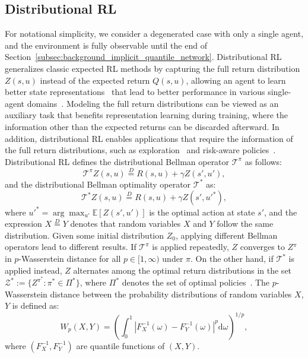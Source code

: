 \documentclass[twoside,11pt]{article}
\newcommand{\state}{s}
\newcommand{\action}{u}
\newcommand{\rewardfunction}{R}
\newcommand{\utilityexp}{Q}
\newcommand{\utility}{Z}
\newcommand{\quantile}{\omega}
\newcommand{\inversecdf}{F^{-1}}
\begin{document}
\subsection{Distributional RL}
\label{subsec:background_distributional_rl}

For notational simplicity, we consider a degenerated case with only a single agent, and the environment is fully observable until the end of Section~\ref{subsec:background_implicit_quantile_network}. Distributional RL generalizes classic expected RL methods by capturing the full return distribution $\utility{}(\state{},\action{})$ instead of the expected return $\utilityexp{}(\state{},\action{})$, allowing an agent to learn better state representations~\citep{BDR2022} that lead to better performance in various single-agent domains~\citep{Bellemare2017C51,Bellemare2019S51,Dabney2018QR-DQN,Dabney2018IQN,Rowland2019ER-DQN,Yang2019FQF,Nguyen2021MMDRL}. Modeling the full return distributions can be viewed as an auxiliary task that benefits representation learning during training, where the information other than the expected returns can be discarded afterward. In addition, distributional RL enables applications that require the information of the full return distributions, such as exploration~\citep{Nikolov2019IDS,Zhang2019QUOTA,Mavrin2019DLTV} and risk-aware policies~\citep{Xia2020risk}. Distributional RL defines the distributional Bellman operator $\mathcal{T}^\pi$ as follows:
\begin{equation}
\mathcal{T}^\pi \utility{}(\state{},\action{})\overset{D}{=}\rewardfunction{}(\state{},\action{})+\gamma \utility{}(\state{}',\action{}'),
\end{equation}
and the distributional Bellman optimality operator $\mathcal{T}^*$ as:
\begin{equation}
\mathcal{T}^* \utility{}(\state{},\action{})\overset{D}{=}\rewardfunction{}(\state{},\action{})+\gamma \utility{}(\state{}',\action{}'^*),
\end{equation}
where $\action{}'^*=\arg\max_{\action'}\mathbb{E}[\utility{}(\state{}',\action')]$ is the optimal action at state $\state{}'$, and the expression $X\overset{D}{=}Y$ denotes that random variables $X$ and $Y$ follow the same distribution. Given some initial distribution $Z_0$, applying different Bellman operators lead to different results.
If $\mathcal{T}^\pi$ is applied repeatedly, $\utility{}$ converges to $\utility{}^\pi$ in $p$-Wasserstein distance for all $p\in[1,\infty)$ under $\pi$.
On the other hand, if $\mathcal{T}^*$ is applied instead, $\utility{}$ alternates among the optimal return distributions in the set $\mathcal{\utility{}}^*:=\{\utility^{\pi^*}:\pi^*\in\Pi^*\}$, where $\Pi^*$ denotes the set of optimal policies~\citep{Bellemare2017C51}. The $p$-Wasserstein distance between the probability distributions of random variables $X$, $Y$ is defined as:
\begin{equation}
W_p(X,Y)=\left(\int_0^1|\inversecdf_X(\quantile)-\inversecdf_Y(\quantile)|^p \mathrm{d}\quantile\right)^{1/p},
\end{equation}
where $(\inversecdf_X,\inversecdf_Y)$ are quantile functions of $(X,Y)$.
\end{document}

